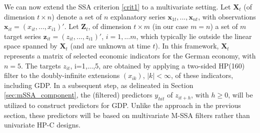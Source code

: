 \documentclass[11pt,a4paper]{article}
\begin{document}
We can now extend the SSA criterion \ref{crit1} to a multivariate setting. Let $\mathbf{X}_t$ (of dimension $t\times n$) denote a set of $n$ explanatory series $\mathbf{x}_{1t},...,\mathbf{x}_{nt}$, with observations $\mathbf{x}_{it}=(x_{it},...,x_{i1})'$. Let $\mathbf{Z}_t$, of dimension $t\times m$ (in our case $m=n$) a set of $m$ target series $\mathbf{z}_{it}=(z_{it},...,z_{i1})'$, $i=1,...m$, which typically lie outside the linear space spanned by $\mathbf{X}_t$  (and are unknown at time $t$). In this framework, $\mathbf{X}_t$ represents a matrix of selected economic indicators for the German economy, with $n=5$. The targets $z_{it}$, i=1,...,5,   are obtained by applying a two-sided HP(160) filter to the doubly-infinite extensions $(x_{ik})$, $|k|<\infty$, of these indicators, including GDP. In a subsequent step, as delineated in Section \ref{sec:mSSA_component}, the (filtered) predictors $y_{hit}$ of $z_{it+h}$, with $h\geq 0$,  will be utilized to construct predictors for GDP. Unlike the approach in the previous section, these predictors will be based on multivariate M-SSA filters rather than univariate HP-C designs. %
\end{document}
